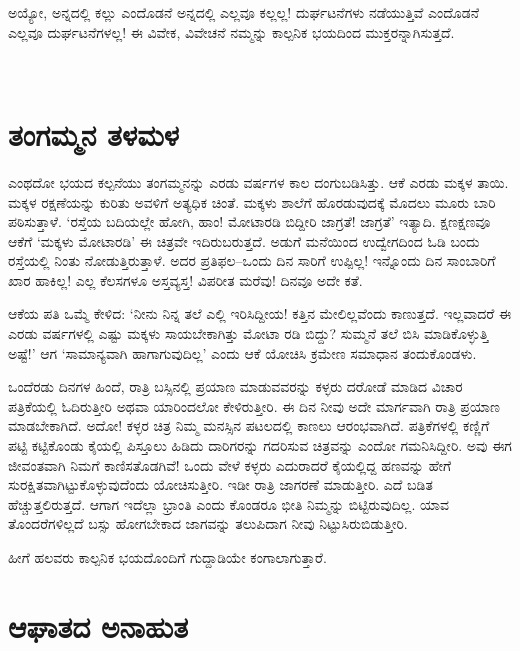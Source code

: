 ಅಯ್ಯೋ, ಅನ್ನದಲ್ಲಿ ಕಲ್ಲು ಎಂದೊಡನೆ ಅನ್ನದಲ್ಲಿ ಎಲ್ಲವೂ ಕಲ್ಲಲ್ಲ! ದುರ್ಘಟನೆಗಳು ನಡೆಯುತ್ತಿವೆ ಎಂದೊಡನೆ ಎಲ್ಲವೂ ದುರ್ಘಟನೆಗಳಲ್ಲ! ಈ ವಿವೇಕ, ವಿವೇಚನೆ ನಮ್ಮನ್ನು ಕಾಲ್ಪನಿಕ ಭಯದಿಂದ ಮುಕ್ತರನ್ನಾಗಿಸುತ್ತದೆ.

~\\[-1.4cm]


\section*{ತಂಗಮ್ಮನ ತಳಮಳ}

\vskip -5pt

ಎಂಥದೋ ಭಯದ ಕಲ್ಪನೆಯು ತಂಗಮ್ಮನನ್ನು ಎರಡು ವರ್ಷಗಳ ಕಾಲ ದಂಗುಬಡಿಸಿತ್ತು. ಆಕೆ ಎರಡು ಮಕ್ಕಳ ತಾಯಿ. ಮಕ್ಕಳ ರಕ್ಷಣೆಯನ್ನು ಕುರಿತು ಅವಳಿಗೆ ಅತ್ಯಧಿಕ ಚಿಂತೆ. ಮಕ್ಕಳು ಶಾಲೆಗೆ ಹೊರಡುವುದಕ್ಕೆ ಮೊದಲು ಮೂರು ಬಾರಿ ಪಠಿಸುತ್ತಾಳೆ. ‘ರಸ್ತೆಯ ಬದಿಯಲ್ಲೇ ಹೋಗಿ, ಹಾಂ! ಮೋಟಾರಡಿ ಬಿದ್ದೀರಿ ಜಾಗ್ರತೆ! ಜಾಗ್ರತೆ’ ಇತ್ಯಾದಿ. ಕ್ಷಣಕ್ಷಣವೂ ಆಕೆಗೆ ‘ಮಕ್ಕಳು ಮೋಟಾರಡಿ’ ಈ ಚಿತ್ರವೇ ಇದಿರುಬರುತ್ತದೆ. ಅಡುಗೆ ಮನೆಯಿಂದ ಉದ್ವೇಗದಿಂದ ಓಡಿ ಬಂದು ರಸ್ತೆಯಲ್ಲಿ ನಿಂತು ನೋಡುತ್ತಿರುತ್ತಾಳೆ. ಅದರ ಪ್ರತಿಫಲ–ಒಂದು ದಿನ ಸಾರಿಗೆ ಉಪ್ಪಿಲ್ಲ! ಇನ್ನೊಂದು ದಿನ ಸಾಂಬಾರಿಗೆ ಖಾರ ಹಾಕಿಲ್ಲ! ಎಲ್ಲ ಕೆಲಸಗಳೂ ಅಸ್ತವ್ಯಸ್ತ! ವಿಪರೀತ ಮರೆವು! ದಿನವೂ ಅದೇ ಕತೆ.

ಆಕೆಯ ಪತಿ ಒಮ್ಮೆ ಕೇಳಿದ: ‘ನೀನು ನಿನ್ನ ತಲೆ ಎಲ್ಲಿ ಇರಿಸಿದ್ದೀಯ! ಕತ್ತಿನ ಮೇಲಿಲ್ಲವೆಂದು ಕಾಣುತ್ತದೆ. ಇಲ್ಲವಾದರೆ ಈ ಎರಡು ವರ್ಷಗಳಲ್ಲಿ ಎಷ್ಟು ಮಕ್ಕಳು ಸಾಯಬೇಕಾಗಿತ್ತು ಮೋಟಾ ರಡಿ ಬಿದ್ದು? ಸುಮ್ಮನೆ ತಲೆ ಬಿಸಿ ಮಾಡಿಕೊಳ್ಳುತ್ತಿ ಅಷ್ಟೆ!’ ಆಗ ‘ಸಾಮಾನ್ಯವಾಗಿ ಹಾಗಾಗುವುದಿಲ್ಲ’ ಎಂದು ಆಕೆ ಯೋಚಿಸಿ ಕ್ರಮೇಣ ಸಮಾಧಾನ ತಂದುಕೊಂಡಳು.

ಒಂದೆರಡು ದಿನಗಳ ಹಿಂದೆ, ರಾತ್ರಿ ಬಸ್ಸಿನಲ್ಲಿ ಪ್ರಯಾಣ ಮಾಡುವವರನ್ನು ಕಳ್ಳರು ದರೋಡೆ ಮಾಡಿದ ವಿಚಾರ ಪತ್ರಿಕೆಯಲ್ಲಿ ಓದಿರುತ್ತೀರಿ ಅಥವಾ ಯಾರಿಂದಲೋ ಕೇಳಿರುತ್ತೀರಿ. ಈ ದಿನ ನೀವು ಅದೇ ಮಾರ್ಗವಾಗಿ ರಾತ್ರಿ ಪ್ರಯಾಣ ಮಾಡಬೇಕಾಗಿದೆ. ಅದೋ! ಕಳ್ಳರ ಚಿತ್ರ ನಿಮ್ಮ ಮನಸ್ಸಿನ ಪಟಲದಲ್ಲಿ ಕಾಣಲು ಆರಂಭವಾಗಿದೆ. ಪತ್ರಿಕೆಗಳಲ್ಲಿ ಕಣ್ಣಿಗೆ ಪಟ್ಟಿ ಕಟ್ಟಿಕೊಂಡು ಕೈಯಲ್ಲಿ ಪಿಸ್ತೂಲು ಹಿಡಿದು ದಾರಿಗರನ್ನು ಗದರಿಸುವ ಚಿತ್ರವನ್ನು ಎಂದೋ ಗಮನಿಸಿದ್ದೀರಿ. ಅವು ಈಗ ಜೀವಂತವಾಗಿ ನಿಮಗೆ ಕಾಣಿಸತೊಡಗಿವೆ! ಒಂದು ವೇಳೆ ಕಳ್ಳರು ಎದುರಾದರೆ ಕೈಯಲ್ಲಿದ್ದ ಹಣವನ್ನು ಹೇಗೆ ಸುರಕ್ಷಿತವಾಗಿಟ್ಟುಕೊಳ್ಳುವುದೆಂದು ಯೋಚಿಸುತ್ತೀರಿ. ಇಡೀ ರಾತ್ರಿ ಜಾಗರಣೆ ಮಾಡುತ್ತೀರಿ. ಎದೆ ಬಡಿತ ಹೆಚ್ಚುತ್ತಲಿರುತ್ತದೆ. ಆಗಾಗ ಇದೆಲ್ಲಾ ಭ್ರಾಂತಿ ಎಂದು ಕೊಂಡರೂ ಭೀತಿ ನಿಮ್ಮನ್ನು ಬಿಟ್ಟಿರುವುದಿಲ್ಲ. ಯಾವ ತೊಂದರೆಗಳಿಲ್ಲದೆ ಬಸ್ಸು ಹೋಗಬೇಕಾದ ಜಾಗವನ್ನು ತಲುಪಿದಾಗ ನೀವು ನಿಟ್ಟುಸಿರುಬಿಡುತ್ತೀರಿ.

ಹೀಗೆ ಹಲವರು ಕಾಲ್ಪನಿಕ ಭಯದೊಂದಿಗೆ ಗುದ್ದಾಡಿಯೇ ಕಂಗಾಲಾಗುತ್ತಾರೆ.


\section*{ಆಘಾತದ ಅನಾಹುತ}


